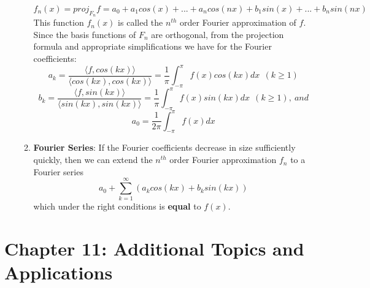 \documentclass[10pt]{article}
\begin{document}
\begin{enumerate}
\begin{enumerate}
$$f_n(x) = proj_{F_n}f = a_0 + a_1cos(x) + ... + a_ncos(nx) + b_1sin(x) + ... + b_nsin(nx)$$
This function $f_n(x)$ is called the $n^{th}$ order Fourier approximation of $f$. Since the basis functions of $F_n$ are orthogonal, from the projection formula and appropriate simplifications we have for the Fourier coefficients:
$$a_k = \frac{\langle f,cos(kx) \rangle}{\langle cos(kx),cos(kx) \rangle} = \frac{1}{\pi} \int_{-\pi}^{\pi}f(x)cos(kx)dx\ \ (k \geq 1)$$ 
$$b_k = \frac{\langle f,sin(kx) \rangle}{\langle sin(kx),sin(kx) \rangle} = \frac{1}{\pi} \int_{-\pi}^{\pi}f(x)sin(kx)dx\ \ (k \geq 1),\ and$$
$$a_0 = \frac{1}{2\pi} \int_{-\pi}^{\pi}f(x)dx$$
\item \textbf{Fourier Series}: If the Fourier coefficients decrease in size sufficiently quickly, then we can extend the $n^{th}$ order Fourier approximation $f_n$ to a Fourier series
$$a_0 + \sum_{k=1}^{\infty}(a_kcos(kx) + b_ksin(kx))$$
which under the right conditions is \textbf{equal} to $f(x)$.
\end{enumerate}
\end{enumerate}
\section{Chapter 11: Additional Topics and Applications}
\end{document}

